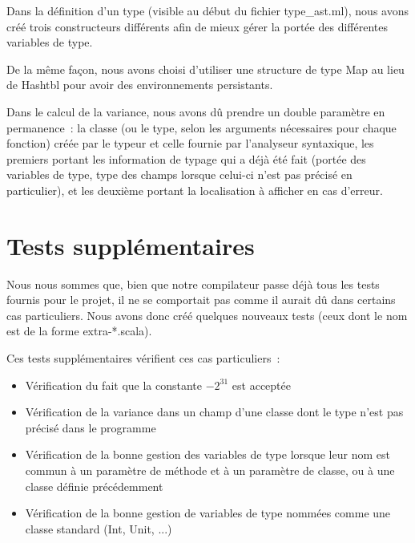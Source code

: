 \documentclass[a4paper,10pt]{article}
\newcommand{\code}[1]{{\fontfamily{pcr}\selectfont #1}}
\begin{document}
Dans la définition d'un type (visible au début du fichier
\code{type\_{}ast.ml}), nous avons créé trois constructeurs différents
afin de mieux gérer la portée des différentes variables de type.

De la même façon, nous avons choisi d'utiliser une structure de type
\code{Map} au lieu de \code{Hashtbl} pour avoir des environnements
persistants.

Dans le calcul de la variance, nous avons dû prendre un double
paramètre en permanence~: la classe (ou le type, selon les arguments
nécessaires pour chaque fonction) créée par le typeur et celle fournie
par l'analyseur syntaxique, les premiers portant les information de
typage qui a déjà été fait (portée des variables de type, type des
champs lorsque celui-ci n'est pas précisé en particulier), et les
deuxième portant la localisation à afficher en cas d'erreur.

\section{Tests supplémentaires}

Nous nous sommes que, bien que notre compilateur passe déjà tous les
tests fournis pour le projet, il ne se comportait pas comme il aurait
dû dans certains cas particuliers. Nous avons donc créé quelques
nouveaux tests (ceux dont le nom est de la forme \code{extra-*.scala}).

Ces tests supplémentaires vérifient ces cas particuliers~:
\begin{itemize}
\item{Vérification du fait que la constante $-2^{31}$ est acceptée}
\item{Vérification de la variance dans un champ d'une classe dont le
    type n'est pas précisé dans le programme}
\item{Vérification de la bonne gestion des variables de type lorsque
    leur nom est commun à un paramètre de méthode et à un paramètre de
  classe, ou à une classe définie précédemment}
\item{Vérification de la bonne gestion de variables de type nommées
    comme une classe standard (\code{Int}, \code{Unit}, ...)}
\end{itemize}
\end{document}

